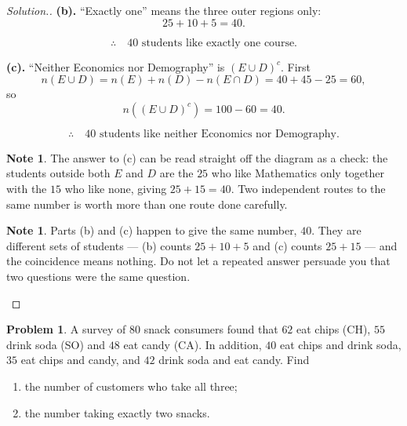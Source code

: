 \documentclass[11pt,a4paper]{article}
\theoremstyle{definition}
\newtheorem{note}[thm]{Note}
\newtheorem{problemx}{Problem}[section]
\newenvironment{problem}{\begin{problemx}}{\end{problemx}}
\newenvironment{solution}
  {\renewcommand{\qedsymbol}{}\begin{proof}[\textit{Solution}.]}
  {\end{proof}}
\begin{document}
\begin{solution}
\textbf{(b).} ``Exactly one'' means the three outer regions only:
$$25+10+5=40.$$

$$\therefore\quad 40 \text{ students like exactly one course}.$$

\textbf{(c).} ``Neither Economics nor Demography'' is $(E\cup D)^c$. First
$$n(E\cup D)=n(E)+n(D)-n(E\cap D)=40+45-25=60,$$
so
$$n\left((E\cup D)^c\right)=100-60=40.$$

$$\therefore\quad 40 \text{ students like neither Economics nor Demography}.$$

\begin{note}
The answer to (c) can be read straight off the diagram as a check: the students outside
both $E$ and $D$ are the $25$ who like Mathematics only together with the $15$ who like
none, giving $25+15=40$. Two independent routes to the same number is worth more than
one route done carefully.
\end{note}

\begin{note}
Parts (b) and (c) happen to give the same number, $40$. They are different sets of
students --- (b) counts $25+10+5$ and (c) counts $25+15$ --- and the coincidence means
nothing. Do not let a repeated answer persuade you that two questions were the same
question.
\end{note}
\end{solution}

\begin{problem}
A survey of $80$ snack consumers found that $62$ eat chips (CH), $55$ drink soda (SO)
and $48$ eat candy (CA). In addition, $40$ eat chips and drink soda, $35$ eat chips and
candy, and $42$ drink soda and eat candy. Find
\begin{enumerate}
\item[(a).] the number of customers who take all three;
\item[(b).] the number taking exactly two snacks.
\end{enumerate}
\end{problem}
\end{document}
